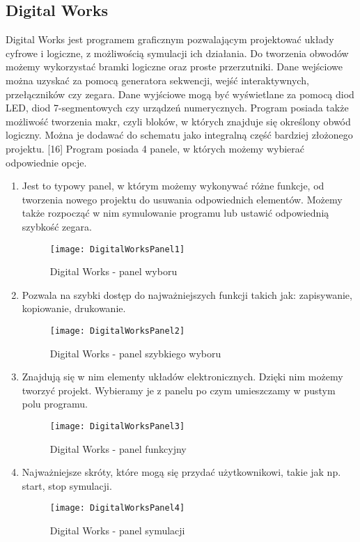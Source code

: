 \documentclass[12pt, a4paper, onside, polish]{article}				%
\begin{document}
\subsection{Digital Works}
\hspace{\parindent}
Digital Works jest programem graficznym pozwalającym projektować układy cyfrowe i logiczne, z możliwością symulacji ich działania. Do tworzenia obwodów możemy wykorzystać bramki logiczne oraz proste przerzutniki. Dane wejściowe można uzyskać za pomocą generatora sekwencji, wejść interaktywnych, przełączników czy zegara. Dane wyjściowe mogą być wyświetlane za pomocą diod LED, diod 7-segmentowych czy urządzeń numerycznych. Program posiada także możliwość tworzenia makr, czyli bloków, w których znajduje się określony obwód logiczny. Można je dodawać do schematu jako integralną część bardziej złożonego projektu. [16]  \newline\newline
Program posiada 4 panele, w których możemy wybierać odpowiednie opcje.
 \begin{enumerate}
\item Jest to typowy panel, w którym możemy wykonywać różne funkcje, od tworzenia nowego projektu do usuwania odpowiednich elementów. Możemy także rozpocząć w nim symulowanie programu lub ustawić odpowiednią szybkość zegara. 
  	\begin{figure}[H]
  	  {\centering \texttt{[image: DigitalWorksPanel1]} \caption{Digital Works - panel wyboru}}\vspace{5mm}
    	\end{figure}

\item Pozwala na szybki dostęp do najważniejszych funkcji takich jak: zapisywanie, kopiowanie, drukowanie.
	\begin{figure}[H]
  	  {\centering \texttt{[image: DigitalWorksPanel2]} \caption{Digital Works - panel szybkiego wyboru}}\vspace{5mm}
    	\end{figure}

\item Znajdują się w nim elementy układów elektronicznych. Dzięki nim możemy tworzyć projekt. Wybieramy je z panelu po czym umieszczamy w pustym polu programu. 
   	\begin{figure}[H]
  	  {\centering \texttt{[image: DigitalWorksPanel3]} \caption{Digital Works - panel funkcyjny}}\vspace{5mm}
    	\end{figure}

\item Najważniejsze skróty, które mogą się przydać użytkownikowi, takie jak np. start, stop symulacji. 
   	\begin{figure}[H]
  	  {\centering \texttt{[image: DigitalWorksPanel4]} \caption{Digital Works - panel symulacji}}\vspace{5mm}
    	\end{figure}
\end{enumerate}
\end{document}
